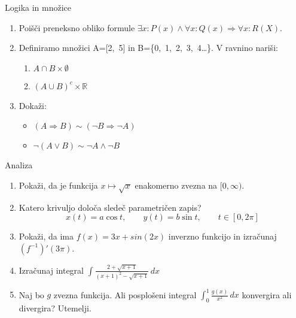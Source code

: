 \begin{frame}{Logika in množice}
	\begin{enumerate}
		\item
		Poišči preneksno obliko formule
		\( \exists x: P(x) \land \forall x: Q(x) \Rightarrow \forall x: R(X) \).
		\item 
		Definiramo množici A=[2,~5] in B=\{0,~1,~2,~3,~4\dots\}.
		V ravnino nariši:
		\begin{enumerate}
		   \item \( A \cap B \times \emptyset \)
		   \item \( (A \cup B)^c \times \mathbb{R} \)
		\end{enumerate}
		\item
		Dokaži:
		\begin{itemize}
			\item \( (A \Rightarrow B) \sim (\neg B \Rightarrow \neg A) \)
			\item \( \neg (A \lor B) \sim \neg A \land \neg B \)
		\end{itemize}
	\end{enumerate}
\end{frame}

\begin{frame}{Analiza}
	\begin{enumerate}
		\item Pokaži, da je funkcija \( x \mapsto \sqrt{x} \) enakomerno zvezna na $[0, \infty)$.
		\item Katero krivuljo določa sledeč parametričen zapis?
		$$
		   x(t) = a \cos t, \qquad %
		   y(t) = b \sin t, \qquad %
		   t \in [0, 2 \pi]
		$$ 
		\item
		Pokaži, da ima \( f(x)=3x+sin(2x) \) inverzno funkcijo in izračunaj \( (f^{-1})'(3\pi) \).
		
		\item
		Izračunaj integral 
		\( \displaystyle \int\frac{2+\sqrt{x+1}}{(x+1)^2-\sqrt{x+1}}\, dx \)
		\item 
		Naj bo $g$ zvezna funkcija. Ali posplošeni integral 
		\( \int_{0}^{1}\frac{g(x)}{x^2}\, dx \)
		konvergira ali divergira? Utemelji.
	\end{enumerate}
\end{frame}

